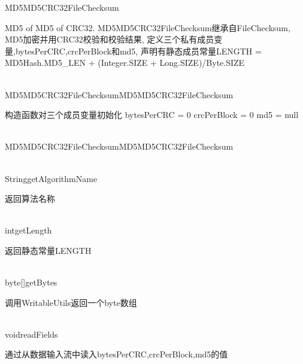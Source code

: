 \begin{XeClass}{MD5MD5CRC32FileChecksum}
   
 MD5 of MD5 of CRC32.
 MD5MD5CRC32FileChecksum继承自FileChecksum,
 MD5加密并用CRC32校验和校验结果,
 定义三个私有成员变量,bytesPerCRC,crcPerBlock和md5,
 声明有静态成员常量LENGTH = MD5Hash.MD5{\_}LEN + (Integer.SIZE + Long.SIZE)/Byte.SIZE

  \begin{XeMethod}{\XePublic\\ }{MD5MD5CRC32FileChecksum}{MD5MD5CRC32FileChecksum}
       
 构造函数对三个成员变量初始化
 bytesPerCRC = 0
 crcPerBlock = 0
 md5 = null

  \end{XeMethod}

  \begin{XeMethod}{\XePublic\\ }{MD5MD5CRC32FileChecksum}{MD5MD5CRC32FileChecksum}
       

  \end{XeMethod}

  \begin{XeMethod}{\XePublic\\ }{String}{getAlgorithmName}
       
 返回算法名称

  \end{XeMethod}

  \begin{XeMethod}{\XePublic\\ }{int}{getLength}
       
 返回静态常量LENGTH

  \end{XeMethod}

  \begin{XeMethod}{\XePublic\\ }{byte[]}{getBytes}
       
 调用WritableUtils返回一个byte数组

  \end{XeMethod}

  \begin{XeMethod}{\XePublic\\ }{void}{readFields}
       
 通过从数据输入流中读入bytesPerCRC,crcPerBlock,md5的值

  \end{XeMethod}


\end{XeClass}
